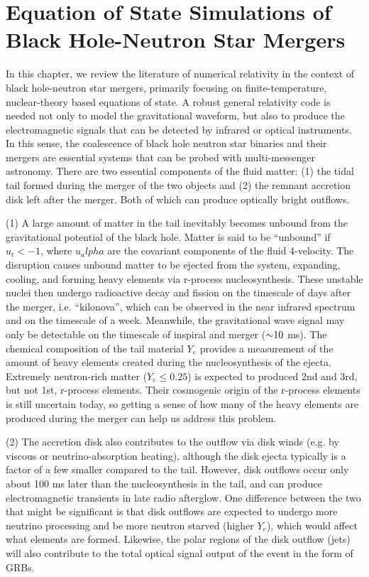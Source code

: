 \chapter{Equation of State Simulations of Black Hole-Neutron Star Mergers}
\label{chap:chapter-4}

In this chapter, we review the literature of numerical relativity in the context of black hole-neutron star mergers, primarily focusing on finite-temperature, nuclear-theory based equations of state.  
A robust general relativity code is needed not only to model the gravitational waveform, but also to produce the electromagnetic signals that can be detected by infrared or optical instruments.  
In this sense, the coalescence of black hole neutron star binaries and their mergers are essential systems that can be probed with multi-messenger astronomy.   
There are two essential components of the fluid matter: (1) the tidal tail formed during the merger of the two objects and (2) the remnant accretion disk left after the merger.  
Both of which can produce optically bright outflows.

(1) A large amount of matter in the tail inevitably becomes unbound from the gravitational potential of the black hole.  Matter is said to be ``unbound'' if $u_t < -1$, where $u_alpha$ are the covariant components of the fluid 4-velocity.  
The disruption causes unbound matter to be ejected from the system, expanding, cooling, and forming heavy elements via r-process nucleosynthesis.
These unstable nuclei then undergo radioactive decay and fission on the timescale of days after the merger, i.e. ``kilonova'', which can be observed in the near infrared spectrum and on the timescale of a week.
Meanwhile, the gravitational wave signal may only be detectable on the timescale of inspiral and merger ($\mathord{\sim}10$ ms).
The chemical composition of the tail material $Y_e$ provides a measurement of the amount of heavy elements created during the nucleosynthesis of the ejecta. 
Extremely neutron-rich matter ($Y_e \le 0.25$) is expected to produced 2nd and 3rd, but not 1st, r-process elements.  
Their cosmogenic origin of the r-process elements is still uncertain today, so getting a sense of how many of the heavy elements are produced during the merger can help us address this problem.
  
(2)  The accretion disk also contributes to the outflow via disk winds (e.g. by viscous or neutrino-absorption heating), although the disk ejecta typically is a factor of a few smaller compared to the tail.
However, disk outflows occur only about 100 ms later than the nucleosynthesis in the tail, and can produce electromagnetic transients in late radio afterglow.
One difference between the two that might be significant is that disk outflows are expected to undergo more neutrino processing and be more neutron starved (higher $Y_e$), which would affect what elements are formed.
Likewise, the polar regions of the disk outflow (jets) will also contribute to the total optical signal output of the event in the form of GRBs.

